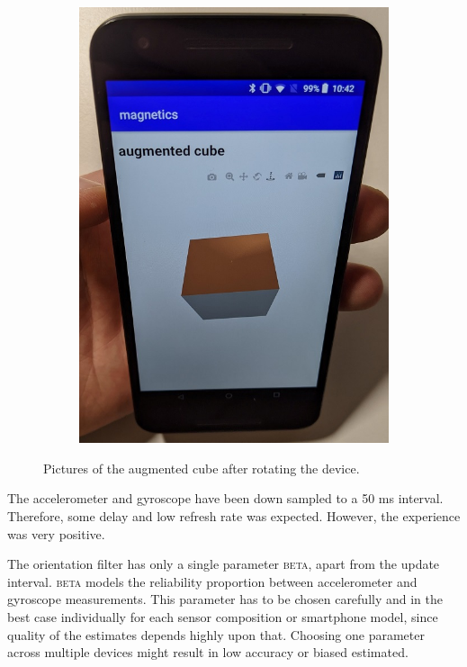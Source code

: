 \begin{figure}[hbt!]
\begin{subfigure}{0.3\textwidth}
        \includegraphics[height=1.5\linewidth]{figures/cube_bottom.jpg}
    \end{subfigure}
    \caption{Pictures of the augmented cube after rotating the device.}
    \label{fig:cubes}
\end{figure}

The accelerometer and gyroscope have been down sampled to a 50 ms interval. Therefore, some delay and low refresh rate was expected. However, the experience was very positive.

The orientation filter has only a single parameter \textsc{beta}, apart from the update interval. \textsc{beta} models the reliability proportion between accelerometer and gyroscope measurements. This parameter has to be chosen carefully and in the best case individually for each sensor composition or smartphone model, since quality of the estimates depends highly upon that. Choosing one parameter across multiple devices might result in low accuracy or biased estimated.

